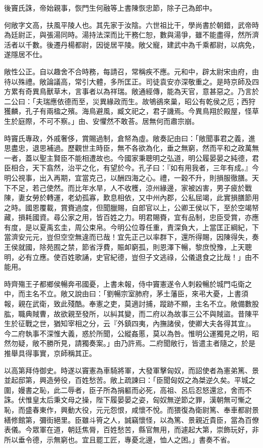 \begin{pinyinscope}
後竇氏誅，帝始親事，恢門生何融等上書陳恢忠節，除子己為郎中。

何敞字文高，扶風平陵人也。其先家于汝陰。六世祖比干，學尚書於朝錯，武帝時為廷尉正，與張湯同時。湯持法深而比干務仁恕，數與湯爭，雖不能盡得，然所濟活者以千數。後遷丹楊都尉，因徙居平陵。敞父寵，建武中為千乘都尉，以病免，遂隱居不仕。

敞性公正。自以趣舍不合時務，每請召，常稱疾不應。元和中，辟太尉宋由府，由待以殊禮。敞論議高，常引大體，多所匡正。司徒袁安亦深敬重之。是時京師及四方累有奇異鳥獸草木，言事者以為祥瑞。敞通經傳，能為天官，意甚惡之。乃言於二公曰：「夫瑞應依德而至，災異緣政而生。故鴝鵒來巢，昭公有乾侯之厄；西狩獲麟，孔子有兩楹之殯。海鳥避風，臧文祀之，君子譏焉。今異鳥翔於殿屋，怪草生於庭際，不可不察。」由、安懼然不敢荅。居無何而肅宗崩。

時竇氏專政，外戚奢侈，賞賜過制，倉帑為虛。敞奏記由曰：「敞聞事君之義，進思盡忠，退思補過。歷觀世主時臣，無不各欲為化，垂之無窮，然而平和之政萬無一者，蓋以聖主賢臣不能相遭故也。今國家秉聰明之弘道，明公履晏晏之純德，君臣相合，天下翕然，治平之化，有望於今。孔子曰：『如有用我者，三年有成。』今明公視事，出入再期，宜當克己，以酬四海之心。禮，一穀不升，則損服徹膳。天下不足，若己使然。而比年水旱，人不收穫，涼州緣邊，家被凶害，男子疲於戰陳，妻女勞於轉運，老幼孤寡，歎息相依，又中州內郡，公私屈竭，此實損膳節用之時。國恩覆載，賞賚過度，但聞臘賜，自郎官以上，公卿王侯以下，至於空竭帑藏，損耗國資。尋公家之用，皆百姓之力。明君賜賚，宜有品制，忠臣受賞，亦應有度，是以夏禹玄圭，周公束帛。今明公位尊任重，責深負大，上當匡正綱紀，下當濟安元元，豈但空空無違而已哉！宜先正己以率群下，還所得賜，因陳得失，奏王侯就國，除苑囿之禁，節省浮費，賑卹窮孤，則恩澤下暢，黎庶悅豫，上天聰明，必有立應。使百姓歌誦，史官紀德，豈但子文逃祿，公儀退食之比哉！」由不能用。

時齊殤王子都鄉侯暢奔弔國憂，上書未報，侍中竇憲遂令人刺殺暢於城門屯衛之中，而主名不立。敞又說由曰：「劉暢宗室肺府，茅土藩臣，來弔大憂，上書須報，親在武衛，致此殘酷。奉憲之吏，莫適討捕，蹤跡不顯，主名不立。敞備數股肱，職典賊曹，故欲親至發所，以糾其變，而二府以為故事三公不與賊盜。昔陳平生於征戰之世，猶知宰相之分，云『外鎮四夷，內撫諸侯，使卿大夫各得其宜』。今二府執事不深惟大義，惑於所聞，公縱姦慝，莫以為咎。惟明公運獨見之明，昭然勿疑，敞不勝所見，請獨奏案。」由乃許焉。二府聞敞行，皆遣主者隨之，於是推舉具得事實，京師稱其正。

以高第拜侍御史。時遂以竇憲為車騎將軍，大發軍擊匈奴，而詔使者為憲弟篤、景並起邸第，興造勞役，百姓愁苦。敞上疏諫曰：「臣聞匈奴之為桀逆久矣。平城之圍，嫚書之恥，此二辱者，臣子所為捐軀而必死，高祖、呂后忍怒還忿，舍而不誅。伏惟皇太后秉文母之操，陛下履晏晏之姿，匈奴無逆節之罪，漢朝無可慚之恥，而盛春東作，興動大役，元元怨恨，咸懷不悅。而猥復為衛尉篤、奉車都尉景繕修館第，彌街絕里。臣雖斗筲之人，誠竊懷怪，以為篤、景親近貴臣，當為百僚表儀。今眾軍在道，朝廷焦脣，百姓愁苦，縣官無用，而遽起大第，崇飾玩好，非所以垂令德，示無窮也。宜且罷工匠，專憂北邊，恤人之困。」書奏不省。


\end{pinyinscope}
